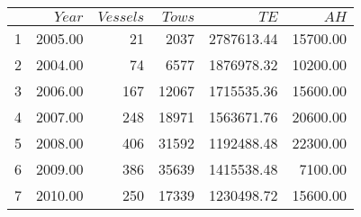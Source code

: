 \begin{tabular}{rrrrrr}
  \hline
 & $Year$ & $Vessels$ & $Tows$ & $TE$ & $AH$ \\ 
  \hline
1 & 2005.00 & 21 & 2037 & 2787613.44 & 15700.00 \\ 
  2 & 2004.00 & 74 & 6577 & 1876978.32 & 10200.00 \\ 
  3 & 2006.00 & 167 & 12067 & 1715535.36 & 15600.00 \\ 
  4 & 2007.00 & 248 & 18971 & 1563671.76 & 20600.00 \\ 
  5 & 2008.00 & 406 & 31592 & 1192488.48 & 22300.00 \\ 
  6 & 2009.00 & 386 & 35639 & 1415538.48 & 7100.00 \\ 
  7 & 2010.00 & 250 & 17339 & 1230498.72 & 15600.00 \\ 
   \hline
\end{tabular}
